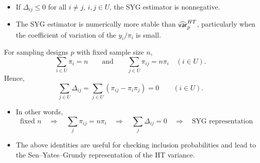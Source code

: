 \documentclass{my_eth_beamer}
\numberwithin{equation}{section}
\begin{document}
\begin{frame}
    \begin{itemize}
    \setlength{\itemsep}{6pt}
        \item If $\Delta_{ij}\leq0$ for all $i\neq j$, $i,j\in U$, the SYG
            estimator is \alert{nonnegative}.
        \item The SYG estimator is \alert{numerically more stable} than
            $\widehat{\mathsf{var}}_p^{HT}$, particularly when the coefficient of
            variation of the $y_i/\pi_i$ is small.
    \end{itemize}
    \vspace{1em}
    \begin{Exkurs}
        \vspace{0.25em}
        For sampling designs $p$ with \alert{fixed sample size} $n$,
        \begin{equation*}
        \sum_{i\in U}\pi_i=n
        \qquad\text{and}\qquad
        \sum_{j\in U}\pi_{ij}=n\pi_i
        \quad (i\in U).
        \end{equation*}
        Hence,
        \begin{equation*}
        \sum_{j\in U}\Delta_{ij}
        =
        \sum_{j\in U}(\pi_{ij}-\pi_i\pi_j)
        =0
        \qquad (i\in U).
        \end{equation*}
        \vspace{0.25em}
    \end{Exkurs}
\end{frame}

\begin{frame}
    \begin{Exkurs_forts}[cont.]
        \vspace{0.25em}
        \begin{itemize}
        \setlength{\itemsep}{12pt}
            \item In other words,
                \begin{equation*}
                    \text{fixed $n$} \quad \Longrightarrow \quad
                    \sum_{j} \pi_{ij} = n \pi_i \quad \Longrightarrow \quad
                    \sum_{j} \Delta_{ij} = 0 \quad \Longrightarrow \quad
                    \text{SYG representation}
                \end{equation*}
            \item The above identities are useful for checking inclusion
                probabilities and lead to the Sen--Yates--Grundy representation
                of the HT variance.
        \end{itemize}
    \end{Exkurs_forts}
\end{frame}
\end{document}
